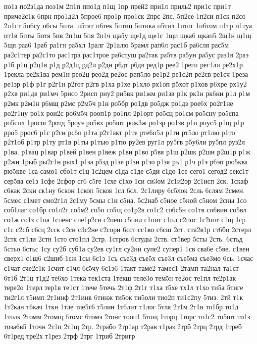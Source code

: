 {по1з
по2з1да
поэ1м
2п1п
ппо1д
п1щ
1пр
прей2
при1л
приль2
при1с
при1т
приче2с1к
6прн
про1д2л
5прое6
про1р
про1ск
2прс
2пс.
5п2се
1п2си
п1ск
п2со
2п1ст
5п6су
п6сы
5пта.
п5тат
п6тек
5птиц
5птика
п5тил
1птог
1п6том
п1тр
п1туа
пт1в
5пты
5птя
5пв
2п1ш
5пя
2п1ч
ща5у
ще1д
ще1с
1щи
щка6
щкап5
2щ1н
щ1щ
5щя
раа6
1раб
ра1гн
ра5хл
1ралг
2р1алю
5рамл
рап6л
рас1б
ра6сля
рас5м
ра2с1тер
ра2с1то
рас1тра
рас1трое
ра6стуш
ра2так
ра5тв
ра5ун
ра5ус
раз1в
2раэ
р1б
р1ц
р2ц1в
р1д
р2д1ц
рд2л
р2дн
р6дт
р6дв
ред1р
рее2
1реги
рег1ли
ре2х1р
1рекла
ре2к1ва
рем1н
рео2ц
рео2д
ре2ос
реп5ло
ре1р2
ре1с2п
ре2св
ре1сч
1реза
ре1зр
р1ф
р1г
р2г1н
р2гот
р2гв
р1ха
р1хе
р1хло
рх1оп
р5хот
р1хов
р6хре
рх1у2
р2хв
ри1дв
ри1мч
5рисо
2рисп
риу2
ри5вк
ри1жм
ри1зв
р1к
рк1н
рк6ни
р1л
р1м
р2мк
р2м1н
р6мщ
р2мс
р2м5ч
р1н
ро5бр
ро1дв
ро5дж
ро1дз
рое6х
ро2г1не
ро2г1ну
ро1х
рои2с
ро6м5ч
рооп1р
ро1пл
2р1орт
ро5сц
ро1см
ро5сну
ро5спа
ро5спл
1росш
2ротд
5роуэ
ро5вх
ро5шт
рож3ж
ро1зр
ро1зв
р1п
рпус5
р1щ
р1р
рро5
ррос6
р1с
р2сн
рс6п
р1та
р2т1акт
р1те
рте6п5л
р1ти
рт5ло
рт1лю
р1то
р2т1об
р1тр
р1ту
рт1в
р1ты
р1тью
р1тю
ру2ев
руг1л
ру5гв
р5у6ли
ру5пл
руз2л
р1ва.
р1вац
р1вар
р1вей
р1вен
р1веж
р1ви
р1во
р5вя
р1ш
р2шк
р2шн
р2ш1р
р1ж
р2жн
1рыб
ры2г1н
рых1
р1за
р5зд
р1зе
р1зи
р1зо
р1зя
ръ1
р1ч
р1э
р6эп
рю5ква
рю5кве
1са
само1
сбо1т
с1ц
1с2цем
с1да
с1де
с5ди
с1до
1се
сего1
сегод2
секс1т
сер5ва
се1з
1сфе
2сфор
сг6
с5ге
1схе
с1хо
1си
си3ом
2с1и2ор
2с1исп
2ск.
1скаф
с6как
2скн
ск1ну
6скон
1скоп
5скоя
1сл
6сл.
2с1лиру
6с5лок
2сль
6слям
2смен.
5смес
с1мет
смо2г1л
2с1му
5смы
с1н
с5на.
5с2наб
с5ное
с5ной
с5ном
2сны
1со
соб1лаг
со1бр
со1л2г
со5м2
со5о
со5щ
со1р2в
со1с2
со6с5н
со1тв
со6вин
со5вл
со1ж
со1з
с1па
1спенс
спе1р2си
с2пеш
с5пил
с1пит
с1пл
с2пос
1с2пот
с1щ
1ср
с1с
с2сб
с6сц
2сск
с2сн
с3с2не
с2сори
6сст
сс1во
с6сш
2ст.
ста2в1р
ст6бо
2стерл
2стк
ст1ли
2стн
1сто
сто1пл
2стр.
1стров
6студы
2ств.
ст5вер
5сты
2сть.
6стьд
5стьо
6стьс
1су
су2б
суб1а
су2ев
су1гл
су2ни
супе2
супер1
1св
сва6е
с5ве.
с1вен
сверх1
с1ш6
с2шиб
1сж
1сы
6с1з
1съ
съе3д
съе5х
съе3л
съе5ма
съе3мо
6сь.
1счас
с1чат
сче2с1к
1счит
с1чл
6с5чу
6с1э6
1такт
таме2
тамес1
2тамп
та2нал
та1ст
6т1б
2т1ц
т1д2
те6хо
1тека
тек1ста
1текш
теле3о
тем5н
те2ос
те1пл
те2р1ак
тере2о
1терл
тер1в
те1ст
1тече
5течь
2т1ф
2т1г
т1ха
т5хе
тх1л
т1хо
ти5а
5тиге
ти2г1л
т5имп
2т1инф
2т1инв
6тинж
ти5ок
ти5оли
тио2п
ти1с2пу
5тиз.
2тй
т1к
1т2кан
т6кач
1ткн
1тле
тле5г6
т5лин
1т6лит
т1лог
5тля
2т1м
2т1н
то1бр
то1д
1толк
2томм
2томщ
6томс
6томэ
2тонг
тооп1
5тощ
1торц
1торс
то1с2
то5шт
то1з
тоза6в5
1точн
2т1п
2т1щ
2тр.
2трабо
2тр1ар
т2рав
т1раз
2трб
2трц
2трд
1треб
6т1ред
тре2х
т1рез
2трф
2трг
1триб
2тригр
}
